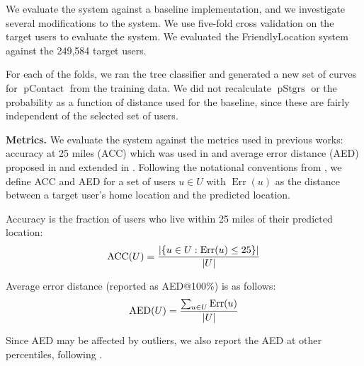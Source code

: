 \documentclass[letterpaper]{article}
\DeclareMathOperator{\pContact}{pContact}
\DeclareMathOperator{\pStrangers}{pStgrs}
\DeclareMathOperator{\Err}{Err}
\DeclareMathOperator{\AED}{AED}
\DeclareMathOperator{\ACC}{ACC}
\begin{document}
We evaluate the system against a baseline implementation, and we investigate
several modifications to the system.
%
We use five-fold cross validation on the target users to evaluate the system.
We evaluated the FriendlyLocation system against the 249,584 target users.

For each of the folds, we ran the tree classifier and generated a new set of
curves for $\pContact$ from the training data.
%
We did not recalculate $\pStrangers$ or the probability as a function of distance
used for the baseline, since these are fairly independent of the selected set
of users.

\noindent\textbf{Metrics.} We evaluate the system against the metrics used in
previous works: accuracy at 25 miles (ACC) which was used in
\cite{backstrom2010find} and average error distance (AED) proposed in
\cite{cheng2010you} and extended in \cite{li2012towards}.
%
Following the notational conventions from \cite{li2012towards}, we define ACC
and AED for a set of users $u \in U$ with $\Err(u)$ as the distance between a
target user's home location and the predicted location.

Accuracy is the fraction of users who live within 25 miles of their predicted
location:
\[
    \ACC(U) = { |\{ u \in U : \Err(u)\le25 \}| \over |U| }
\]

Average error distance (reported as AED@100\%) is as follows:
\[
    \AED(U) = { \sum_{u \in U} \Err(u) \over |U| }
\]

Since AED may be affected by outliers, we also report the AED at other
percentiles, following \cite{li2012towards}.

\end{document}
